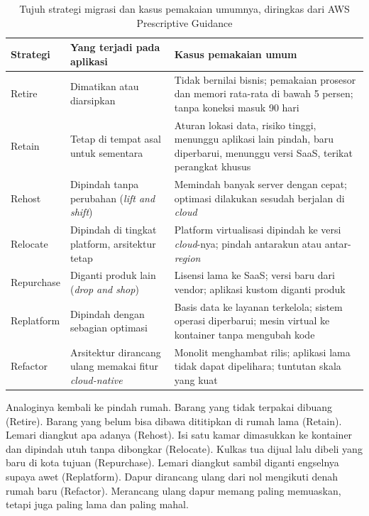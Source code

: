 \begin{table}[!htb]
  \centering
  \footnotesize
  \caption{Tujuh strategi migrasi dan kasus pemakaian umumnya, diringkas dari AWS
           Prescriptive Guidance}
  \label{tab:ch04-tujuh-r}
  \begin{tabularx}{\textwidth}{>{\raggedright\arraybackslash}p{1.8cm}
                               >{\raggedright\arraybackslash}X
                               >{\raggedright\arraybackslash}X}
    \hline
    \textbf{Strategi} & \textbf{Yang terjadi pada aplikasi} & \textbf{Kasus pemakaian
      umum} \\
    \hline
    Retire & Dimatikan atau diarsipkan & Tidak bernilai bisnis; pemakaian prosesor dan
      memori rata-rata di bawah 5 persen; tanpa koneksi masuk 90 hari \\
    \hline
    Retain & Tetap di tempat asal untuk sementara & Aturan lokasi data, risiko tinggi,
      menunggu aplikasi lain pindah, baru diperbarui, menunggu versi SaaS, terikat
      perangkat khusus \\
    \hline
    Rehost & Dipindah tanpa perubahan (\textit{lift and shift}) & Memindah banyak server
      dengan cepat; optimasi dilakukan sesudah berjalan di \textit{cloud} \\
    \hline
    Relocate & Dipindah di tingkat platform, arsitektur tetap & Platform virtualisasi
      dipindah ke versi \textit{cloud}-nya; pindah antarakun atau antar-\textit{region} \\
    \hline
    Repurchase & Diganti produk lain (\textit{drop and shop}) & Lisensi lama ke SaaS;
      versi baru dari vendor; aplikasi kustom diganti produk \\
    \hline
    Replatform & Dipindah dengan sebagian optimasi & Basis data ke layanan terkelola;
      sistem operasi diperbarui; mesin virtual ke kontainer tanpa mengubah kode \\
    \hline
    Refactor & Arsitektur dirancang ulang memakai fitur \textit{cloud-native} & Monolit
      menghambat rilis; aplikasi lama tidak dapat dipelihara; tuntutan skala yang kuat \\
    \hline
  \end{tabularx}
\end{table}

Analoginya kembali ke pindah rumah. Barang yang tidak terpakai dibuang (Retire). Barang
yang belum bisa dibawa dititipkan di rumah lama (Retain). Lemari diangkut apa adanya
(Rehost). Isi satu kamar dimasukkan ke kontainer dan dipindah utuh tanpa dibongkar
(Relocate). Kulkas tua dijual lalu dibeli yang baru di kota tujuan (Repurchase). Lemari
diangkut sambil diganti engselnya supaya awet (Replatform). Dapur dirancang ulang dari
nol mengikuti denah rumah baru (Refactor). Merancang ulang dapur memang paling memuaskan,
tetapi juga paling lama dan paling mahal.

